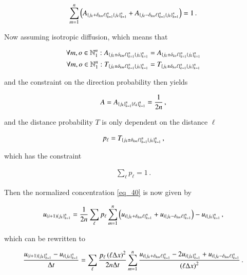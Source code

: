 \documentclass[11pt,english,a4paper]{article}
\begin{document}
\begin{flushleft}
\begin{align*}
\sum_{m=1}^n \left({A_{\left\lbrace{j_k+\delta_{km}\ell}\right\rbrace_{k=1}^n\left\lbrace{j_k}\right\rbrace_{k=1}^n}+A_{\left\lbrace{j_k-\delta_{km}\ell}\right\rbrace_{k=1}^n\left\lbrace{j_k}\right\rbrace_{k=1}^n}}\right) = 1 \,.
\end{align*}

Now assuming isotropic diffusion, which means that

\begin{align*}
\forall m,o\in \mathbb{N}_1^n : A_{\left\lbrace{j_k\pm\delta_{km} \ell}\right\rbrace_{k=1}^n\left\lbrace{j_k}\right\rbrace_{k=1}^n} &= A_{\left\lbrace{j_k\pm\delta_{ko} \ell}\right\rbrace_{k=1}^n\left\lbrace{j_k}\right\rbrace_{k=1}^n} \\
\forall m,o\in \mathbb{N}_1^n : T_{\left\lbrace{j_k\pm\delta_{km} \ell}\right\rbrace_{k=1}^n\left\lbrace{j_k}\right\rbrace_{k=1}^n} &= T_{\left\lbrace{j_k\pm\delta_{ko} \ell}\right\rbrace_{k=1}^n\left\lbrace{j_k}\right\rbrace_{k=1}^n}
\end{align*}

and the constraint on the direction probability then yields

\begin{align}
A = A_{\left\lbrace{j_k}\right\rbrace_{k=1}^n\left\lbrace{\ell_k}\right\rbrace_{k=1}^n} = \frac{1}{2n}\,,
\label{eq_42}
\end{align}

and the distance probability $T$ is only dependent on the distance $\ell$

\begin{align*}
p_\ell = T_{\left\lbrace{j_k\pm\delta_{km} \ell}\right\rbrace_{k=1}^n\left\lbrace{j_k}\right\rbrace_{k=1}^n}\,,
\end{align*}

which has the constraint

\begin{align*}
\sum_{\ell} p_\ell = 1\,.
\end{align*}

Then the normalized concentration \eqref{eq_40} is now given by

\begin{align*}
u_{(i+1)\left({j_k}\right)_{k=1}^n} = \frac{1}{2n}\sum_\ell p_\ell\sum_{m=1}^n \left({u_{i\left\lbrace{j_k+\delta_{km}\ell}\right\rbrace_{k=1}^n} + u_{i\left\lbrace{j_k-\delta_{km}\ell}\right\rbrace_{k=1}^n}}\right) - u_{i\left\lbrace{j_k}\right\rbrace_{k=1}^n} \,,
\end{align*}

which can be rewritten to

\begin{align}
\frac{u_{(i+1)\left\lbrace{j_k}\right\rbrace_{k=1}^n}-u_{i\left\lbrace{j_k}\right\rbrace_{k=1}^n}}{\Delta t} = \sum_{\ell}\frac{p_\ell \left({\ell \Delta x}\right)^2}{2n\Delta t}\sum_{m=1}^n\frac{u_{i\left\lbrace{j_k+\delta_{km}\ell}\right\rbrace_{k=1}^n} - 2 u_{i\left\lbrace{j_k}\right\rbrace_{k=1}^n} + u_{i\left\lbrace{j_k-\delta_{km}\ell}\right\rbrace_{k=1}^n}}{\left({\ell\Delta x}\right)^2} \,.
\label{eq_43}
\end{align}


\end{flushleft}
\end{document}
